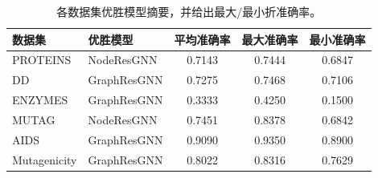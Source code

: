 \begin{table}[t]
\centering
\footnotesize
\caption{各数据集优胜模型摘要，并给出最大/最小折准确率。}
\label{tab:all_winners}
\begin{tabular}{l l c c c}
\toprule
数据集 & 优胜模型 & 平均准确率 & 最大准确率 & 最小准确率 \\
\midrule
PROTEINS & NodeResGNN & 0.7143 & 0.7444 & 0.6847 \\
DD & GraphResGNN & 0.7275 & 0.7468 & 0.7106 \\
ENZYMES & GraphResGNN & 0.3333 & 0.4250 & 0.1500 \\
MUTAG & NodeResGNN & 0.7451 & 0.8378 & 0.6842 \\
AIDS & GraphResGNN & 0.9090 & 0.9350 & 0.8900 \\
Mutagenicity & GraphResGNN & 0.8022 & 0.8316 & 0.7629 \\
\bottomrule
\end{tabular}
\end{table}
